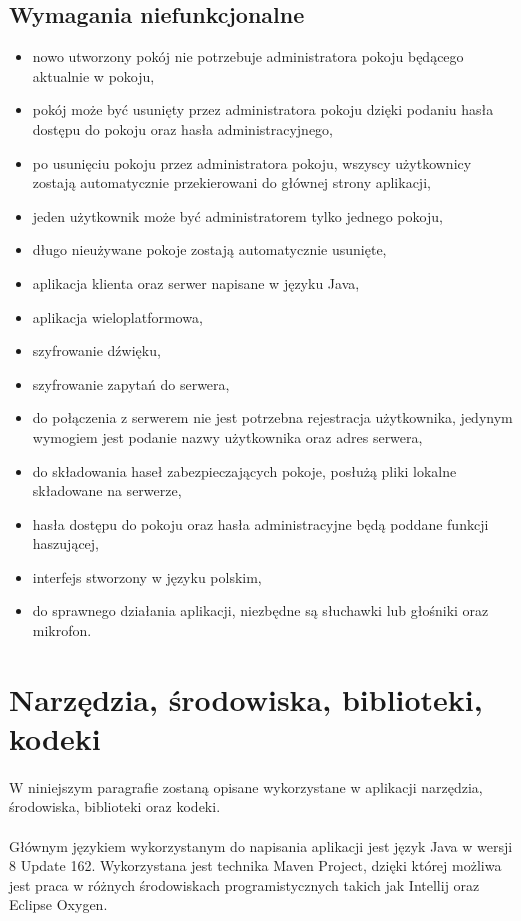 \documentclass{article}
\begin{document}
	\subsection{Wymagania niefunkcjonalne}
	\begin{itemize}
		\item nowo utworzony pokój nie potrzebuje administratora pokoju będącego aktualnie w pokoju,
		\item pokój może być usunięty przez administratora pokoju dzięki podaniu hasła dostępu do pokoju oraz hasła administracyjnego,
		\item po usunięciu pokoju przez administratora pokoju, wszyscy użytkownicy zostają automatycznie przekierowani do głównej strony aplikacji,
		\item jeden użytkownik może być administratorem tylko jednego pokoju,
		\item długo nieużywane pokoje zostają automatycznie usunięte,
		\item aplikacja klienta oraz serwer napisane w języku Java,
		\item aplikacja wieloplatformowa,
		\item szyfrowanie dźwięku,
		\item szyfrowanie zapytań do serwera,
		\item do połączenia z serwerem nie jest potrzebna rejestracja użytkownika, jedynym wymogiem jest podanie nazwy użytkownika oraz adres serwera,
		\item do składowania haseł zabezpieczających pokoje, posłużą pliki lokalne składowane na serwerze,
		\item hasła dostępu do pokoju oraz hasła administracyjne będą poddane funkcji haszującej,
		\item interfejs stworzony w języku polskim,
		\item do sprawnego działania aplikacji, niezbędne są słuchawki lub głośniki oraz mikrofon.
	\end{itemize}
	\section{Narzędzia, środowiska, biblioteki, kodeki}
	\paragraph*{} W niniejszym paragrafie zostaną opisane wykorzystane w aplikacji narzędzia, środowiska, biblioteki oraz kodeki.
	\paragraph*{} Głównym językiem wykorzystanym do napisania aplikacji jest język Java w wersji 8 Update 162. Wykorzystana jest technika Maven Project, dzięki której możliwa jest praca w różnych środowiskach programistycznych takich jak Intellij oraz Eclipse Oxygen.
\end{document}
